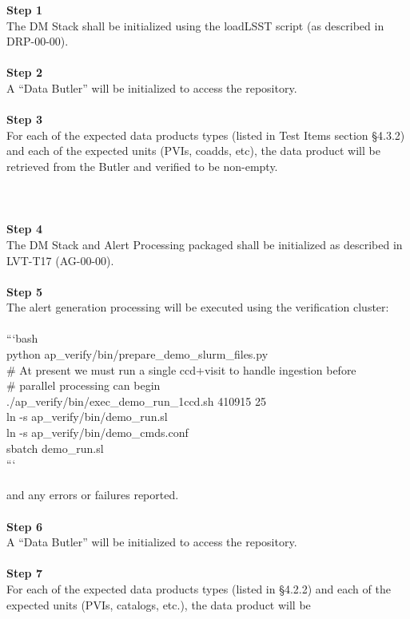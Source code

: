 \textbf{Step 1}\\
The DM Stack shall be initialized using the loadLSST script (as
described in DRP-00-00).\\
~\\
\textbf{Step 2}\\
A ``Data Butler'' will be initialized to access the repository.\\
~\\
\textbf{Step 3}\\
For each of the expected data products types (listed in Test Items
section §4.3.2) and each of the expected units (PVIs, coadds, etc), the
data product will be retrieved from the Butler and verified to be
non-empty.\\
~\\
~\\
~\\
\textbf{Step 4}\\
The DM Stack and Alert Processing packaged shall be initialized as
described in LVT-T17 (AG-00-00).\\
~\\
\textbf{Step 5}\\
The alert generation processing will be executed using the verification
cluster:\\
~\\
```bash\\
python ap\_verify/bin/prepare\_demo\_slurm\_files.py\\
\# At present we must run a single ccd+visit to handle ingestion
before\\
\# parallel processing can begin\\
./ap\_verify/bin/exec\_demo\_run\_1ccd.sh 410915 25\\
ln -s ap\_verify/bin/demo\_run.sl\\
ln -s ap\_verify/bin/demo\_cmds.conf\\
sbatch demo\_run.sl\\
```\\
~\\
and any errors or failures reported.\\
~\\
\textbf{Step 6}\\
A ``Data Butler'' will be initialized to access the repository.\\
~\\
\textbf{Step 7}\\
For each of the expected data products types (listed in §4.2.2) and each
of the expected units (PVIs, catalogs, etc.), the data product will be
